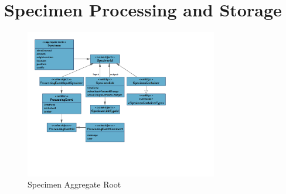 \chapter{Specimen Processing and Storage}
\label{chap:specimen-processing}

\begin{figure}[H]
  \centering
  \includegraphics[trim={10mm 50mm 72mm 10mm}, clip,
    width=0.75\textwidth]{images/specimen}
  \caption{Specimen Aggregate Root}
  \label{fig:specimen}
\end{figure}


